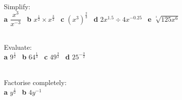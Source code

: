 \documentclass[fleqn]{article}
\begin{document}
\begin{examplebox}{}{}
	\\ %
	Simplify: \\
	\textbf{a}\hspace{2mm} $\dfrac{x^3}{x^{-3}}$											\hspace{7mm} \
	\textbf{b}\hspace{2mm} $x^{\textstyle\frac{1}{2}}\times x^{\textstyle\frac{3}{2}}$	\hspace{7mm} \
	\textbf{c}\hspace{2mm} $(x^3)^{\textstyle\frac{2}{3}}$								\hspace{7mm} \
	\textbf{d}\hspace{2mm} $2x^{1.5}\div 4x^{-0.25}$										\hspace{7mm} \
	\textbf{e}\hspace{2mm} $\sqrt[\textstyle{^3}]{125x^6}$								\hspace{7mm}
\end{examplebox}


\newpage
\begin{examplebox}{}{}
	\\ %
	Evaluate: 
	\vspace{1.5mm}\\
	\textbf{a}\hspace{2mm} $9^{\textstyle\frac{1}{2}}$			\hspace{15mm} \
	\textbf{b}\hspace{2mm} $64^{\textstyle\frac{1}{3}}$	 	\hspace{15mm} \
	\textbf{c}\hspace{2mm} $49^{\textstyle\frac{3}{2}}$		\hspace{15mm} \
	\textbf{d}\hspace{2mm} $25^{-\textstyle\frac{3}{2}}$	 	\hspace{15mm}
\end{examplebox}
\vspace{9cm}
\begin{examplebox}{}{}
	\\ %
	Factorise completely:
	\vspace{1.5mm}\\
	\textbf{a}\hspace{2mm} $y^{\textstyle\frac{1}{2}}$		\hspace{15mm} \
	\textbf{b}\hspace{2mm} $4y^{-1}$	 			\hspace{7mm}
\end{examplebox}
\end{document}
